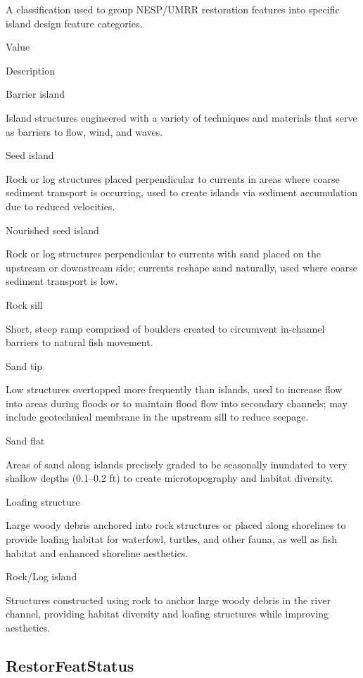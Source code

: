 \documentclass[
  letterpaper,
  DIV=11,
  numbers=noendperiod]{scrreprt}
\begin{document}
A classification used to group NESP/UMRR restoration features into
specific island design feature categories.

Value

Description

Barrier island

Island structures engineered with a variety of techniques and materials
that serve as barriers to flow, wind, and waves.

Seed island

Rock or log structures placed perpendicular to currents in areas where
coarse sediment transport is occurring, used to create islands via
sediment accumulation due to reduced velocities.

Nourished seed island

Rock or log structures perpendicular to currents with sand placed on the
upstream or downstream side; currents reshape sand naturally, used where
coarse sediment transport is low.

Rock sill

Short, steep ramp comprised of boulders created to circumvent in-channel
barriers to natural fish movement.

Sand tip

Low structures overtopped more frequently than islands, used to increase
flow into areas during floods or to maintain flood flow into secondary
channels; may include geotechnical membrane in the upstream sill to
reduce seepage.

Sand flat

Areas of sand along islands precisely graded to be seasonally inundated
to very shallow depths (0.1--0.2 ft) to create microtopography and
habitat diversity.

Loafing structure

Large woody debris anchored into rock structures or placed along
shorelines to provide loafing habitat for waterfowl, turtles, and other
fauna, as well as fish habitat and enhanced shoreline aesthetics.

Rock/Log island

Structures constructed using rock to anchor large woody debris in the
river channel, providing habitat diversity and loafing structures while
improving aesthetics.

\subsection{RestorFeatStatus}\label{restorfeatstatus-7}
\end{document}
